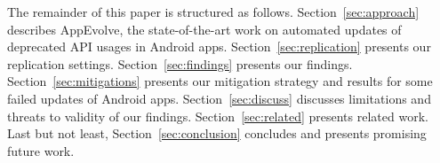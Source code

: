 The remainder of this paper is structured as follows. Section~\ref{sec:approach} describes AppEvolve, the state-of-the-art work on automated updates of deprecated API usages in Android apps. Section~\ref{sec:replication} presents our replication settings. Section~\ref{sec:findings} presents our findings. Section~\ref{sec:mitigations} presents our mitigation strategy and results for some failed updates of Android apps.
Section~\ref{sec:discuss} discusses limitations and threats to validity of our findings.
Section~\ref{sec:related} presents related work.
Last but not least, Section~\ref{sec:conclusion} concludes and presents promising future work.
